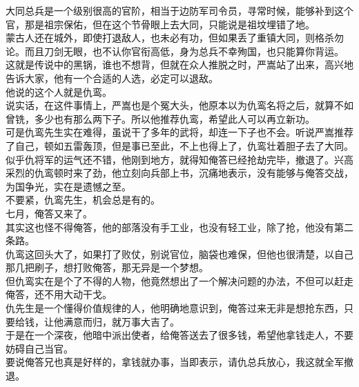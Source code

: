 \begin{multicols}{\theparacolNo}
大同总兵是一个级别很高的官阶，相当于边防军司令员，寻常时候，能够补到这个官，那是祖宗保佑，但在这个节骨眼上去大同，只能说是祖坟埋错了地。\\

蒙古人还在城外，即使打退敌人，也未必有功，但如果丢了重镇大同，则格杀勿论。而且刀剑无眼，也不认你官衔高低，身为总兵不幸殉国，也只能算你背运。\\

这就是传说中的黑锅，谁也不想背，但就在众人推脱之时，严嵩站了出来，高兴地告诉大家，他有一个合适的人选，必定可以退敌。\\

他说的这个人就是仇鸾。\\

说实话，在这件事情上，严嵩也是个冤大头，他原本以为仇鸾名将之后，就算不如曾铣，多少也有那么两下子。所以他推荐仇鸾，希望此人可以再立新功。\\

可是仇鸾先生实在难得，虽说干了多年的武将，却连一下子也不会。听说严嵩推荐了自己，顿如五雷轰顶，但是事已至此，不上也得上了，仇鸾壮着胆子去了大同。\\

似乎仇将军的运气还不错，他刚到地方，就得知俺答已经抢劫完毕，撤退了。兴高采烈的仇鸾顿时来了劲，他立刻向兵部上书，沉痛地表示，没有能够与俺答交战，为国争光，实在是遗憾之至。\\

不要紧，仇鸾先生，机会总是有的。\\

七月，俺答又来了。\\

其实这也怪不得俺答，他的部落没有手工业，也没有轻工业，除了抢，他没有第二条路。\\

仇鸾这回头大了，如果打了败仗，别说官位，脑袋也难保，但他也很清楚，以自己那几把刷子，想打败俺答，那无异是一个梦想。\\

但仇鸾实在是个了不得的人物，他竟然想出了一个解决问题的办法，不但可以赶走俺答，还不用大动干戈。\\

仇先生是一个懂得价值规律的人，他明确地意识到，俺答过来无非是想抢东西，只要给钱，让他满意而归，就万事大吉了。\\

于是在一个深夜，他暗中派出使者，给俺答送去了很多钱，希望他拿钱走人，不要妨碍自己当官。\\

要说俺答兄也真是好样的，拿钱就办事，当即表示，请仇总兵放心，我这就全军撤退。\\


\end{multicols}
